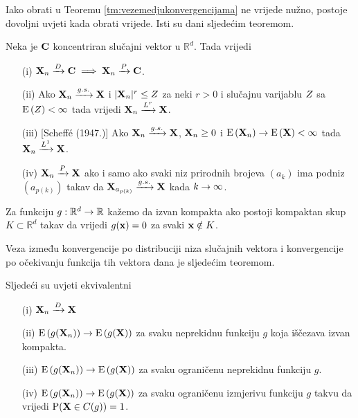 Iako obrati u Teoremu \ref{tm:vezemedjukonvergencijama}
ne vrijede nužno, postoje dovoljni uvjeti kada obrati vrijede.
Isti su dani sljedećim teoremom. 

\begin{tm} Neka je $\tsvek{c}$ koncentriran slučajni vektor u $\mathbb{R}^d$.
	Tada vrijedi
	\begin{itemize}
		\item[(i)]{ $\konvpd{\tsvek{X}_n}{\tsvek{c}} \implies
			\konvpv{\tsvek{X}_n}{\tsvek{c}}$. }
		\item[(ii)]{Ako $\konvgs{\tsvek{X}_n}{\tsvek{X}}$ i 
			$|\tsvek{X}_n|^r \leq \tsvar{Z}$
			za neki $r>0$ i slučajnu varijablu $\tsvar{Z}$ sa
			$\vE{\tsvar{Z}} < \infty$
			tada vrijedi $\konvusr{\tsvek{X}_n}{\tsvek{X}}{r}$.}
		\item[(iii)]{[Scheff\'{e} (1947.)] Ako $\konvgs{\tsvek{X}_n}{\tsvek{X}}$,
			$\tsvek{X}_n \geq 0$ i 
			$\konv{\vE{\tsvek{X}_n}}{\vE{\tsvek{X}}} < \infty$ tada
			$\konvusr{\tsvek{X}_n}{\tsvek{X}}{1}$. }
		\item[(iv)]{$\konvpv{\tsvek{X}_n}{\tsvek{X}}$ 
			ako i samo ako svaki niz prirodnih
			brojeva $(a_k)$ ima podniz $(a_{p(k)})$
			takav da $\konvgs{\tsvek{X}_{a_{p(k)}}}{\tsvek{X}}$
			kada $k \rightarrow \infty$. }
	\end{itemize}

\end{tm}

Za funkciju $g:\mathbb{R}^d \rightarrow \mathbb{R}$ kažemo da
izvan kompakta ako postoji kompaktan skup $K \subset \mathbb{R}^d$
takav da vrijedi $g(\tv{x})=0$ za svaki $\tv{x} \notin K$.

Veza između konvergencije po distribuciji niza slučajnih vektora
i konvergencije po očekivanju funkcija tih vektora dana je
sljedećim teoremom.

\begin{tm}
	Sljedeći su uvjeti ekvivalentni
	\begin{itemize}
		\item[(i)]{$\konvpd{\tsvek{X}_n}{\tsvek{X}}$}
		\item[(ii)]{$\konv{\vE{g(\tsvek{X}_n)}}{\vE{g(\tsvek{X})}}$ za svaku neprekidnu
		funkciju $g$ koja iščezava izvan kompakta.}
		\item[(iii)]{$\konv{\vE{g(\tsvek{X}_n)}}{\vE{g(\tsvek{X})}}$ za svaku
		ograničenu neprekidnu funkciju $g$.}
		\item[(iv)]{$\konv{\vE{g(\tsvek{X}_n)}}{\vE{g(\tsvek{X})}}$ za svaku ograničenu izmjerivu funkciju
			$g$ takvu da vrijedi $\vP(\tsvek{X} \in C(g))=1$.}
	\end{itemize}
\end{tm}

